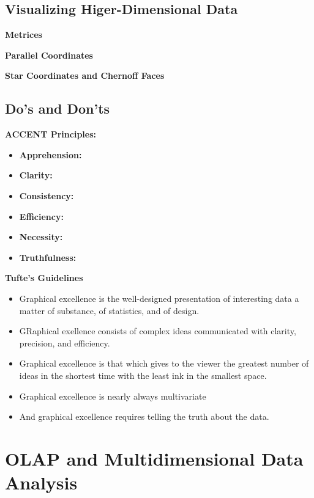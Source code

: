 	\subsection{Visualizing Higer-Dimensional Data}
		{\bf Metrices}

		{\bf Parallel Coordinates}

		{\bf Star Coordinates and Chernoff Faces}

	\subsection{Do's and Don'ts}

		{\bf ACCENT Principles:} 
			\begin{itemize}
				\item {\bf Apprehension:}
				\item {\bf Clarity:}
				\item {\bf Consistency:}
				\item{\bf Efficiency:}
				\item {\bf Necessity:}
				\item {\bf Truthfulness:}
			\end{itemize}

		{\bf Tufte's Guidelines}
			\begin{itemize}
				\item Graphical excellence is the well-designed presentation of
				interesting data a matter of substance, of statistics, and of design.
				\item GRaphical exellence consists of complex ideas communicated 
				with clarity, precision, and efficiency.
				\item Graphical excellence is that which gives to the viewer the greatest
				number of ideas in the shortest time with the least ink in the smallest space.
				\item Graphical excellence is nearly always multivariate
				\item And graphical excellence requires telling the truth about the data.
			\end{itemize}

	\section{OLAP and Multidimensional Data Analysis}